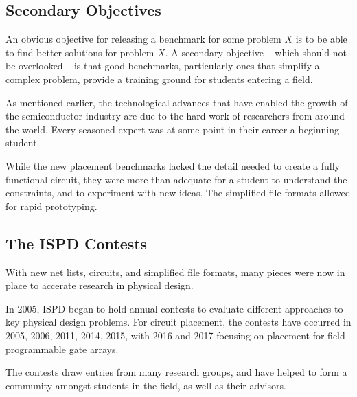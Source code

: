 \documentclass[sigconf]{acmart}
\begin{document}
\subsection{Secondary Objectives}

An obvious objective for releasing a benchmark for
some problem $X$ is to be able to find better solutions
for problem $X$.  A secondary objective -- which should
not be overlooked -- is that good benchmarks, particularly
ones that simplify a complex problem, provide a training
ground for students entering a field.

As mentioned earlier, the technological advances that
have enabled the growth of the semiconductor industry
are due to the hard work of researchers from around the
world.  Every seasoned expert was at some point in their
career a beginning student.

While the new placement benchmarks lacked the detail needed
to create a fully functional circuit, they were more than
adequate for a student to understand the constraints, and
to experiment with new ideas.  The simplified file formats
allowed for rapid prototyping.





\subsection{The ISPD Contests}

With new net lists, circuits, and simplified file formats,
many pieces were now in place to accerate research
in physical design.  

In 2005, ISPD began to hold annual contests to evaluate different
approaches to key physical design problems.  For circuit placement,
the contests have occurred in 2005, 2006, 2011, 2014, 2015, with 2016
and 2017 focusing on placement for field programmable gate arrays.

The contests draw entries from many research groups, and have
helped to form a community amongst students in the field, as
well as their advisors.  
\end{document}
